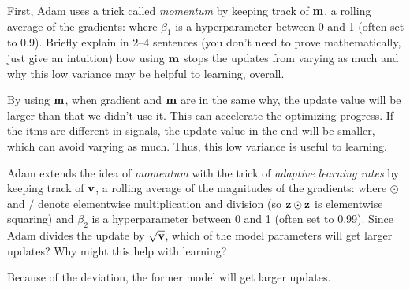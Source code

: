 \begin{parts}
\begin{subparts}
            \subpart[2]First, Adam uses a trick called {\it momentum} by keeping track of $\mathbf{m}$, a rolling average of the gradients:
                where $\beta_1$ is a hyperparameter between 0 and 1 (often set to  0.9). Briefly explain in 2--4 sentences (you don't need to prove mathematically, just give an intuition) how using $\mathbf{m}$ stops the updates from varying as much and why this low variance may be helpful to learning, overall.
                \begin{mdframed}[backgroundcolor=gray!10]\begin{answer}
                By using $\mathbf{m}$, when gradient and $\mathbf{m}$ are in the same why, the update value will be larger than that we didn't use it. This can accelerate the optimizing progress. If the itms are different in signals, the update value in the end will be smaller, which can avoid varying as much. Thus, this low variance is useful to learning.
                \end{answer} \end{mdframed}
            \subpart[2] Adam extends the idea of {\it momentum} with the trick of {\it adaptive learning rates} by keeping track of  $\mathbf{v}$, a rolling average of the magnitudes of the gradients:
                where $\odot$ and $/$ denote elementwise multiplication and division (so $\mathbf{z} \odot \mathbf{z}$ is elementwise squaring) and $\beta_2$ is a hyperparameter between 0 and 1 (often set to  0.99). Since Adam divides the update by $\sqrt{\mathbf{v}}$, which of the model parameters will get larger updates?  Why might this help with learning?
                \begin{mdframed}[backgroundcolor=gray!10]\begin{answer}
                    Because of the deviation, the former model will get larger updates.\\

\end{answer}
\end{mdframed}
\end{subparts}
\end{parts}
